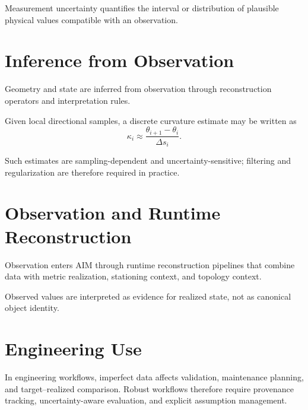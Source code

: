 \begin{definition}
Measurement uncertainty quantifies the interval or distribution of
plausible physical values compatible with an observation.
\end{definition}

\section{Inference from Observation}

Geometry and state are inferred from observation through reconstruction
operators and interpretation rules.

\begin{definition}
Given local directional samples, a discrete curvature estimate may be
written as
\[
\kappa_i \approx \frac{\theta_{i+1}-\theta_i}{\Delta s_i}.
\]
\end{definition}

Such estimates are sampling-dependent and uncertainty-sensitive;
filtering and regularization are therefore required in practice.

\section{Observation and Runtime Reconstruction}

Observation enters AIM through runtime reconstruction pipelines that
combine data with metric realization, stationing context, and topology
context.

Observed values are interpreted as evidence for realized state, not as
canonical object identity.

\section{Engineering Use}

In engineering workflows, imperfect data affects validation, maintenance
planning, and target--realized comparison. Robust workflows therefore
require provenance tracking, uncertainty-aware evaluation, and explicit
assumption management.

